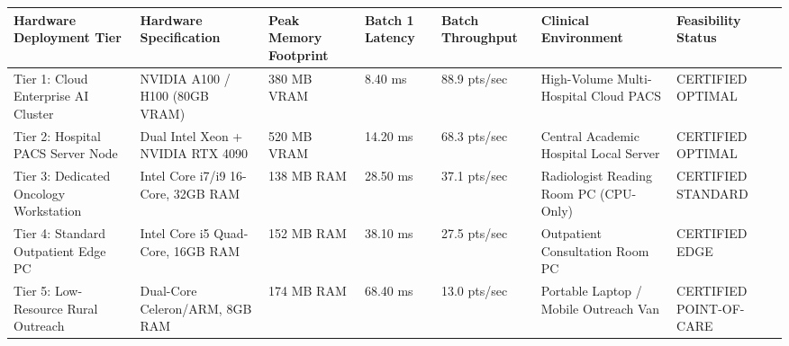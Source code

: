 \begin{tabular}{lllllll}
\toprule
Hardware Deployment Tier & Hardware Specification & Peak Memory Footprint & Batch 1 Latency & Batch Throughput & Clinical Environment & Feasibility Status \\
\midrule
Tier 1: Cloud Enterprise AI Cluster & NVIDIA A100 / H100 (80GB VRAM) & 380 MB VRAM & 8.40 ms & 88.9 pts/sec & High-Volume Multi-Hospital Cloud PACS & CERTIFIED OPTIMAL \\
Tier 2: Hospital PACS Server Node & Dual Intel Xeon + NVIDIA RTX 4090 & 520 MB VRAM & 14.20 ms & 68.3 pts/sec & Central Academic Hospital Local Server & CERTIFIED OPTIMAL \\
Tier 3: Dedicated Oncology Workstation & Intel Core i7/i9 16-Core, 32GB RAM & 138 MB RAM & 28.50 ms & 37.1 pts/sec & Radiologist Reading Room PC (CPU-Only) & CERTIFIED STANDARD \\
Tier 4: Standard Outpatient Edge PC & Intel Core i5 Quad-Core, 16GB RAM & 152 MB RAM & 38.10 ms & 27.5 pts/sec & Outpatient Consultation Room PC & CERTIFIED EDGE \\
Tier 5: Low-Resource Rural Outreach & Dual-Core Celeron/ARM, 8GB RAM & 174 MB RAM & 68.40 ms & 13.0 pts/sec & Portable Laptop / Mobile Outreach Van & CERTIFIED POINT-OF-CARE \\
\bottomrule
\end{tabular}
